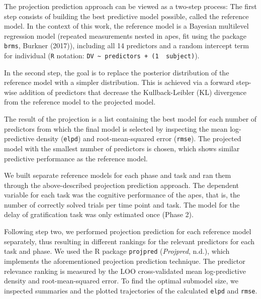 \documentclass[
  man,floatsintext]{apa6}
\begin{document}
The projection prediction approach can be viewed as a two-step process: The first step consists of building the best predictive model possible, called the reference model. In the context of this work, the reference model is a Bayesian multilevel regression model (repeated measurements nested in apes, fit using the package \texttt{brms}, Burkner (2017)), including all 14 predictors and a random intercept term for individual (\texttt{R} notation: \texttt{DV\ \textasciitilde{}\ predictors\ +\ (1\ \textbar{}\ subject)}).

In the second step, the goal is to replace the posterior distribution of the reference model with a simpler distribution. This is achieved via a forward step-wise addition of predictors that decrease the Kullback-Leibler (KL) divergence from the reference model to the projected model.

The result of the projection is a list containing the best model for each number of predictors from which the final model is selected by inspecting the mean log-predictive density (\texttt{elpd}) and root-mean-squared error (\texttt{rmse}). The projected model with the smallest number of predictors is chosen, which shows similar predictive performance as the reference model.

We built separate reference models for each phase and task and ran them through the above-described projection prediction approach. The dependent variable for each task was the cognitive performance of the apes, that is, the number of correctly solved trials per time point and task. The model for the delay of gratification task was only estimated once (Phase 2).

Following step two, we performed projection prediction for each reference model separately, thus resulting in different rankings for the relevant predictors for each task and phase. We used the R package \texttt{projpred} (\emph{Projpred}, n.d.), which implements the aforementioned projection prediction technique. The predictor relevance ranking is measured by the LOO cross-validated mean log-predictive density and root-mean-squared error. To find the optimal submodel size, we inspected summaries and the plotted trajectories of the calculated \texttt{elpd} and \texttt{rmse}.
\end{document}
